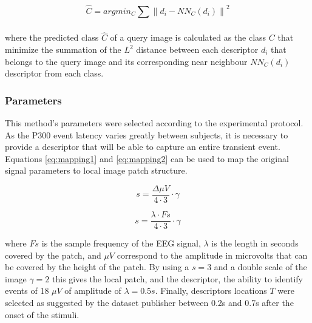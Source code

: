 \documentclass[entropy,article,submit,moreauthors,pdftex,10pt,a4paper]{mdpi}
\begin{document}
\begin{equation}
\hat{C} = argmin_C \sum_{}^{} \left\lVert d_i - NN_C(d_i) \right\rVert ^2
\label{eq:classification}
\end{equation}

\noindent where the predicted class $\hat{C}$ of a query image is calculated as the class $ C $ that minimize the summation of the $ L^2 $ distance between each descriptor $ d_i $ that belongs to the query image and its corresponding near neighbour $ NN_C(d_i) $ descriptor from each class.


\subsubsection{Parameters}

This method's parameters were selected according to the experimental protocol.  As the P300 event latency varies greatly between subjects, it is necessary to provide a descriptor that will be able to capture an entire transient event.  Equations \ref{eq:mapping1} and \ref{eq:mapping2} can be used to map the original signal parameters to local image patch structure. 

\begin{equation}
s = \frac{\Delta \mu V}{4 \cdot 3} \cdot \gamma 
\label{eq:mapping1}
\end{equation}

\begin{equation}
s = \frac{\lambda \cdot Fs}{4 \cdot 3} \cdot \gamma
\label{eq:mapping2}
\end{equation}

\noindent where $ Fs $ is the sample frequency of the EEG signal, $ \lambda $ is the length in seconds covered by the patch, and $ \mu V $ correspond to the amplitude in microvolts that can be covered by the height of the patch.   By using a $ s = 3 $ and a double scale of the image $ \gamma = 2 $ this gives the local patch, and the descriptor, the ability to identify events of 18 $ \mu V $ of amplitude of $ \lambda = 0.5 s $.  Finally, descriptors locations $ T $ were selected as suggested by the dataset publisher \citep{Riccio2013} between 0.2s and 0.7s after the onset of the stimuli. 

\end{document}
